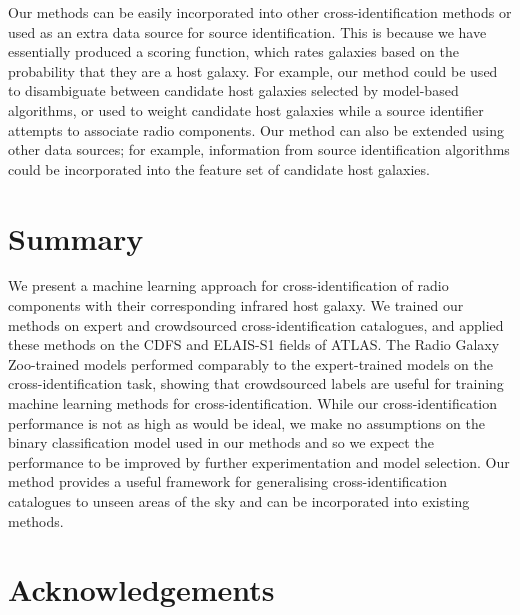 \documentclass[fleqn,usenatbib,usedcolumn]{mnras}
\begin{document}
  Our methods can be easily incorporated into other cross-identification
  methods or used as an extra data source for source identification. This is
  because we have essentially produced a scoring function, which rates
  galaxies based on the probability that they are a host galaxy. For
  example, our method could be used to disambiguate between candidate host
  galaxies selected by model-based algorithms, or used to weight candidate
  host galaxies while a source identifier attempts to associate radio
  components. Our method can also be extended using other data sources; for
  example, information from source identification algorithms could be
  incorporated into the feature set of candidate host galaxies.

\section{Summary}

  We present a machine learning approach for cross-identification of radio
  components with their corresponding infrared host galaxy. We trained our
  methods on expert and crowdsourced cross-identification catalogues, and
  applied these methods on the CDFS and ELAIS-S1 fields of ATLAS. The Radio
  Galaxy Zoo-trained models performed comparably to the expert-trained models
  on the cross-identification task, showing that crowdsourced labels are
  useful for training machine learning methods for cross-identification. While
  our cross-identification performance is not as high as would be ideal, we
  make no assumptions on the binary classification model used in our methods
  and so we expect the performance to be improved by further experimentation
  and model selection. Our method provides a useful framework for generalising
  cross-identification catalogues to unseen areas of the sky and can be
  incorporated into existing methods.

\section{Acknowledgements}
\end{document}
